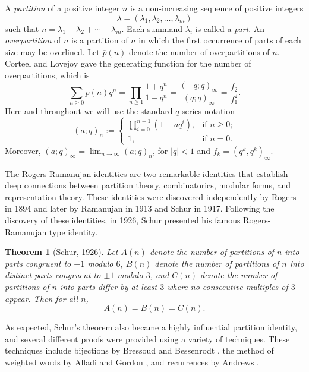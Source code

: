 \documentclass[12pt]{amsart}
\theoremstyle{plain}
\newtheorem{theorem}{Theorem}[section]
\theoremstyle{definition}
\begin{document}
A \emph{partition} of a positive integer $n$ is a non-increasing sequence of positive integers \[\lambda = (\lambda_1, \lambda_2, \dots, \lambda_m)\] such that $n=\lambda_1+\lambda_2+\cdots+\lambda_m$. Each summand $\lambda_i$ is called a \emph{part}. An \emph{overpartition} of $n$ is a partition of $n$ in which  the first occurrence of parts of each size  may be overlined.  Let $\overline{p}(n)$ denote the number of overpartitions of $n$. Corteel and Lovejoy \cite{CorteelLovejoy2003} gave the generating function for the number of overpartitions, which is
\[
\sum_{n\geq 0} \overline{p}(n)q^{n}= \prod_{n\geq 1} \frac{1+q^{n}}{1-q^{n}}=\frac{(-q;q)_\infty}{(q;q)_\infty}=\frac{f_2}{f_1^2}.
\]
Here and throughout we will use the standard $q$-series notation
$$
(a;q)_{n}:=\begin{cases} 
      \prod\limits_{i=0}^{n-1}(1-aq^{i}), &  \text{if $n\geq0$;} \\
      1, & \text{if $n=0$.}
    \end{cases}
$$
Moreover, $(a;q)_{\infty}=\lim_{n\rightarrow \infty}(a;q)_{n}$, for $|q|<1$ and $f_{k}=(q^{k},q^{k})_{\infty}$.


The Rogers-Ramanujan identities \cite{RogersRamanujan1919} are two remarkable identities that establish deep connections between partition theory, combinatorics, modular forms, and representation theory. These identities were discovered independently by Rogers \cite{Rogers1894} in 1894  and later by Ramanujan in 1913 and Schur \cite{Schur1917}  in 1917. Following the discovery of these identities, in 1926, Schur \cite{Schur1926} presented his famous Rogers-Ramanujan type identity.
\begin{theorem}[Schur, 1926] \label{thmSchur}
Let $A(n)$ denote the number of partitions of $n$ into parts congruent to $ \pm 1$ modulo $6$, $B(n)$ denote the number of partitions of $n$ into distinct parts congruent to $ \pm 1$ modulo $3$, and $C(n)$ denote the number of partitions of $n$ into parts differ by at least $3$ where no consecutive multiples of $3$ appear. Then for all $n$, 
\[
A(n)=B(n)=C(n).
\]
\end{theorem}
As expected, Schur's theorem also became a highly influential partition identity, and several different proofs were provided using a variety of techniques. These techniques include bijections by Bressoud \cite{Bressoud1980} and Bessenrodt \cite{Bessenrodt1991}, the method of weighted words by Alladi and Gordon \cite{AlladiGordon1993}, and recurrences by Andrews \cite{Andrews1967a, Andrews1968, Andrews1971}.
\end{document}
